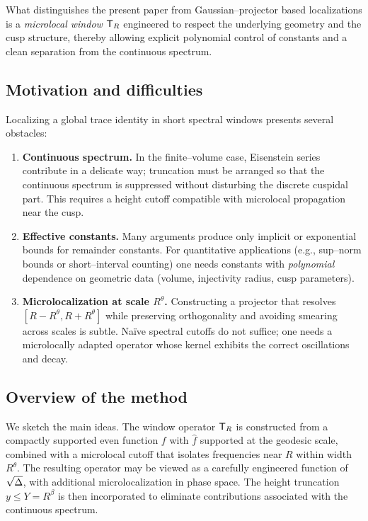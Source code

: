 What distinguishes the present paper from Gaussian--projector based localizations is a
\emph{microlocal window} $\mathsf{T}_R$ engineered to respect the underlying geometry and the cusp
structure, thereby allowing explicit polynomial control of constants and a clean
separation from the continuous spectrum.

\subsection{Motivation and difficulties}\label{subsec:difficulties}
Localizing a global trace identity in short spectral windows presents several obstacles:

\begin{enumerate}
  \item \textbf{Continuous spectrum.} In the finite--volume case, Eisenstein series
        contribute in a delicate way; truncation must be arranged so that the continuous
        spectrum is suppressed without disturbing the discrete cuspidal part. This
        requires a height cutoff compatible with microlocal propagation near the cusp.
  \item \textbf{Effective constants.} Many arguments produce only implicit or exponential
        bounds for remainder constants. For quantitative applications (e.g., sup--norm
        bounds or short--interval counting) one needs constants with \emph{polynomial}
        dependence on geometric data (volume, injectivity radius, cusp parameters).
  \item \textbf{Microlocalization at scale $R^\theta$.} Constructing a projector that
        resolves $[R-R^\theta,R+R^\theta]$ while preserving orthogonality and avoiding
        smearing across scales is subtle. Na\"ive spectral cutoffs do not suffice; one
        needs a microlocally adapted operator whose kernel exhibits the correct
        oscillations and decay.
\end{enumerate}

\subsection{Overview of the method}\label{subsec:method}
We sketch the main ideas. The window operator $\mathsf{T}_R$ is constructed from a compactly
supported even function $f$ with $\widehat{f}$ supported at the geodesic scale, combined
with a microlocal cutoff that isolates frequencies near $R$ within width $R^\theta$. The
resulting operator may be viewed as a carefully engineered function of $\sqrt{\Delta}$,
with additional microlocalization in phase space. The height truncation $y\le Y=R^\beta$
is then incorporated to eliminate contributions associated with the continuous spectrum.

